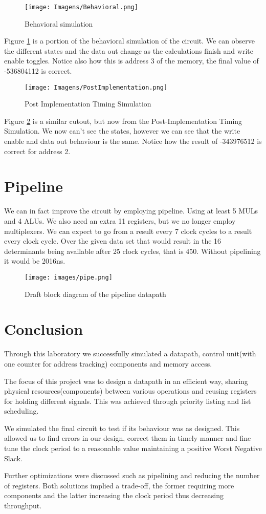 \documentclass[12pt]{article}
\begin{document}
\begin{figure}[H]
	\centering
	\texttt{[image: Imagens/Behavioral.png]}
	\caption{Behavioral simulation}
	\label{fig:behav}
\end{figure}

Figure \ref{fig:behav} is a portion of the behavioral simulation of the circuit. We can observe the different states and the data out change as the calculations finish and write enable toggles. Notice also how this is address 3 of the memory, the final value of -536804112 is correct.


\begin{figure}[H]
	\centering
	\texttt{[image: Imagens/PostImplementation.png]}
	\caption{Post Implementation Timing Simulation}
	\label{fig:PImple}
\end{figure}

Figure \ref{fig:PImple} is a similar cutout, but now from the Post-Implementation Timing Simulation. We now can't see the states, however we can see that the write enable and data out behaviour is the same. Notice how the result of -343976512 is correct for address 2.

\section{Pipeline}

We can in fact improve the circuit by employing pipeline. Using at least 5 MULs and 4 ALUs. We also need an extra 11 registers, but we no longer employ multiplexers.
We can expect to go from a result every 7 clock cycles to a result every clock cycle. Over the given data set that would result in the 16 determinants being available after 25 clock cycles, that is 450. Without pipelining it would be 2016ns.

\begin{figure}[H]
	\centering
	\texttt{[image: images/pipe.png]}
	\caption{Draft block diagram of the pipeline datapath}
	\label{fig:pipe}
\end{figure}

\section{Conclusion}
Through this laboratory we successfully simulated a datapath, control unit(with one counter for address tracking) components and memory access.

The focus of this project was to design a datapath in an efficient way, sharing physical resources(components) between various operations and reusing registers for holding different signals. This was achieved through priority listing and list scheduling.
  
We simulated the final circuit to test if its behaviour was as designed. This allowed us to
find errors in our design, correct them in timely manner and fine tune the clock period to a reasonable value maintaining a positive Worst Negative Slack.

Further optimizations were discussed such as pipelining and reducing the number of registers. Both solutions implied a trade-off, the former requiring more components and the latter increasing the clock period thus decreasing throughput.
\end{document}
